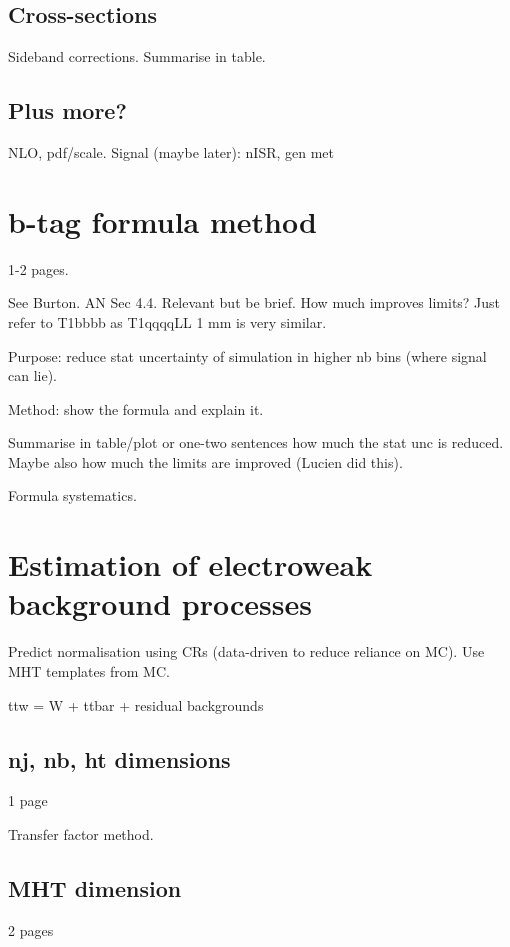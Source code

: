 \subsection{Cross-sections}
Sideband corrections.
Summarise in table.

\subsection{Plus more?}
NLO, pdf/scale.
Signal (maybe later): nISR, gen met

\section{b-tag formula method}
1-2 pages.

See Burton. AN Sec 4.4.
Relevant but be brief.
How much improves limits? Just refer to T1bbbb as T1qqqqLL 1 mm is very similar.

Purpose: reduce stat uncertainty of simulation in higher nb bins (where signal 
can lie).

Method: show the formula and explain it.

Summarise in table/plot or one-two sentences how much the stat unc is reduced. 
Maybe also how much the limits are improved (Lucien did this).

Formula systematics.

\section{Estimation of electroweak background processes}
\label{sec:analysis-estimation-ewk}
Predict normalisation using CRs (data-driven to reduce reliance on MC). Use MHT 
templates from MC.

ttw = W + ttbar + residual backgrounds

\subsection{nj, nb, ht dimensions}
\label{sec:analysis-estimation-njnbht}
1 page

Transfer factor method.

\subsection{MHT dimension}
\label{sec:analysis-estimation-mht}
2 pages

